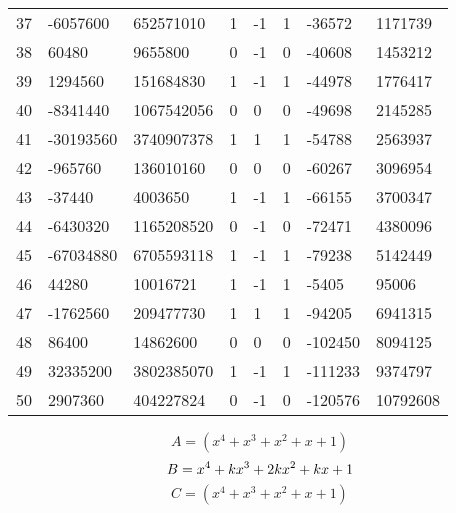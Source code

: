 \documentclass{amsart}
\begin{document}
\begin{longtable}{|l|l|l|lllll|}
37&-6057600&652571010&1&-1&1&-36572&1171739\\
38&60480&9655800&0&-1&0&-40608&1453212\\
39&1294560&151684830&1&-1&1&-44978&1776417\\
40&-8341440&1067542056&0&0&0&-49698&2145285\\
41&-30193560&3740907378&1&1&1&-54788&2563937\\
42&-965760&136010160&0&0&0&-60267&3096954\\
43&-37440&4003650&1&-1&1&-66155&3700347\\
44&-6430320&1165208520&0&-1&0&-72471&4380096\\
45&-67034880&6705593118&1&-1&1&-79238&5142449\\
46&44280&10016721&1&-1&1&-5405&95006\\
47&-1762560&209477730&1&1&1&-94205&6941315\\
48&86400&14862600&0&0&0&-102450&8094125\\
49&32335200&3802385070&1&-1&1&-111233&9374797\\
50&2907360&404227824&0&-1&0&-120576&10792608\\
\hline
\end{longtable}
$$A=(x^4
 + x^3
 + x^2
 + x
 + 1)$$
$$B=x^4
 + k\*x^3
 + 2\*k\*x^2
 + k\*x
 + 1$$
$$C=(x^4
 + x^3
 + x^2
 + x
 + 1)$$
\end{document}
